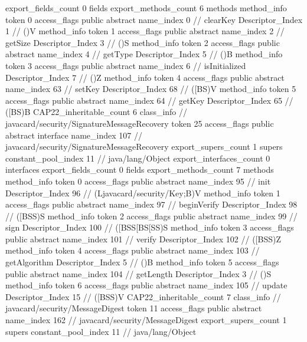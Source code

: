 {{{{			}
			export_fields_count	0
			fields {
			}
			export_methods_count	6
			methods {
				method_info {
					token	0
					access_flags	public abstract
					name_index	0		// clearKey
					Descriptor_Index	1		// ()V
				}
				method_info {
					token	1
					access_flags	public abstract
					name_index	2		// getSize
					Descriptor_Index	3		// ()S
				}
				method_info {
					token	2
					access_flags	public abstract
					name_index	4		// getType
					Descriptor_Index	5		// ()B
				}
				method_info {
					token	3
					access_flags	public abstract
					name_index	6		// isInitialized
					Descriptor_Index	7		// ()Z
				}
				method_info {
					token	4
					access_flags	public abstract
					name_index	63		// setKey
					Descriptor_Index	68		// ([BS)V
				}
				method_info {
					token	5
					access_flags	public abstract
					name_index	64		// getKey
					Descriptor_Index	65		// ([BS)B
				}
			}
			CAP22_inheritable_count	6
		}
		class_info {		// javacard/security/SignatureMessageRecovery
			token	25
			access_flags	public abstract interface
			name_index	107		// javacard/security/SignatureMessageRecovery
			export_supers_count	1
			supers {
				constant_pool_index	11		// java/lang/Object
			}
			export_interfaces_count	0
			interfaces {
			}
			export_fields_count	0
			fields {
			}
			export_methods_count	7
			methods {
				method_info {
					token	0
					access_flags	public abstract
					name_index	95		// init
					Descriptor_Index	96		// (Ljavacard/security/Key;B)V
				}
				method_info {
					token	1
					access_flags	public abstract
					name_index	97		// beginVerify
					Descriptor_Index	98		// ([BSS)S
				}
				method_info {
					token	2
					access_flags	public abstract
					name_index	99		// sign
					Descriptor_Index	100		// ([BSS[BS[SS)S
				}
				method_info {
					token	3
					access_flags	public abstract
					name_index	101		// verify
					Descriptor_Index	102		// ([BSS)Z
				}
				method_info {
					token	4
					access_flags	public abstract
					name_index	103		// getAlgorithm
					Descriptor_Index	5		// ()B
				}
				method_info {
					token	5
					access_flags	public abstract
					name_index	104		// getLength
					Descriptor_Index	3		// ()S
				}
				method_info {
					token	6
					access_flags	public abstract
					name_index	105		// update
					Descriptor_Index	15		// ([BSS)V
				}
			}
			CAP22_inheritable_count	7
		}
		class_info {		// javacard/security/MessageDigest
			token	11
			access_flags	public abstract
			name_index	162		// javacard/security/MessageDigest
			export_supers_count	1
			supers {
				constant_pool_index	11		// java/lang/Object
}}}}
